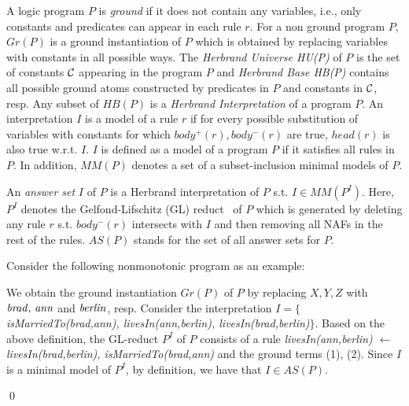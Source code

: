 A logic program $P$ is \textit{ground} if it does not contain any variables, i.e., only constants and predicates can appear in each rule $r$. For a non ground program $P$, $Gr(P)$ is a ground instantiation of $P$ which is obtained by replacing variables with constants in all possible ways. The \textit{Herbrand Universe HU(P)} of $P$ is the set of constants $\mathcal{C}$ appearing in the program $P$ and \textit{Herbrand Base HB(P)} contains all possible ground atoms constructed by predicates in $P$ and constants in $\mathcal{C}$, resp. Any subset of $HB(P)$ is a \textit{Herbrand Interpretation} of a program $P$. An interpretation $I$ is a model of a rule $r$ if for every possible substitution of variables with constants for which $body^+(r), body^-(r)$ are true, $head(r)$ is also true w.r.t. $I$. $I$ is defined as a model of a program $P$ if it satisfies all rules in $P$. In addition, $MM(P)$ denotes a set of a subset-inclusion minimal models of $P$.

An \textit{answer set} $I$ of $P$ is a Herbrand interpretation of $P$ s.t. $I \in MM(P^I)$. Here, $P^I$ denotes the Gelfond-Lifschitz (GL) reduct~\cite{ref50} of $P$ which is generated by deleting any rule $r$ s.t. $body^-(r)$ intersects with $I$ and then removing all NAFs in the rest of the rules. $AS(P)$ stands for the set of all answer sets for $P$.

\begin{example}\label{ex:as}
Consider the following nonmonotonic program as an example:\\
{\small {}}

\normalsize
{\smallskip

\noindent            
We obtain the ground instantiation $Gr(P)$ of $P$ by replacing $X,Y,Z$ with $\mathit{brad, \,ann}$ and $\mathit{berlin}$, resp. Consider the interpretation $I=\{${\small\textit{isMarriedTo(brad,ann), livesIn(ann,berlin), livesIn(brad,berlin)}}$\}$. Based on the above definition, the GL-reduct $P^I$ of $P$ consists of a rule \textit{livesIn(ann,berlin) $\leftarrow$ livesIn(brad,berlin), isMarriedTo(brad,ann)} and the ground terms (1), (2). Since $I$ is a minimal model of $P^I$, by definition, we have that $I \in AS(P)$.}\qed
\end{example}

